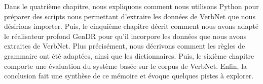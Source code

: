 Dans le quatrième chapitre, nous expliquons comment nous utilisons Python pour préparer des scripts nous permettant d'extraire les données de VerbNet que nous désirions importer. Puis, le cinquième chapitre décrit comment nous avons adapté le réalisateur profond GenDR pour qu'il incorpore les données que nous avons extraites de VerbNet. Plus précisément, nous décrivons comment les règles de grammaire ont été adaptées, ainsi que les dictionnaires. Puis, le sixième chapitre comporte une évaluation du système basée sur le corpus de VerbNet. Enfin, la conclusion fait une synthèse de ce mémoire et évoque quelques pistes à explorer.
